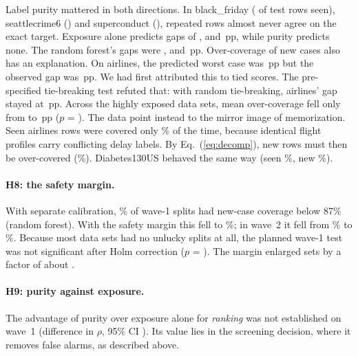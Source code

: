 Label purity mattered in both directions. In black\_friday (\NPrBfPi{} of test rows seen), seattlecrime6 (\NPrScPi{}) and superconduct (\NPrCondPi{}), repeated rows almost never agree on the exact target. Exposure alone predicts gaps of \NPrBfGp{}, \NPrScGp{} and \NPrCondGp{}\,pp, while purity predicts none. The random forest's gaps were \NPrBfRfGap{}, \NPrScRfGap{} and \NPrCondRfGap{}\,pp. Over-coverage of new cases also has an explanation. On airlines, the predicted worst case was \NPrAirGs{}\,pp but the observed gap was \NPrAirRfGap{}\,pp. We had first attributed this to tied scores. The pre-specified tie-breaking test refuted that: with random tie-breaking, airlines' gap stayed at \NTbAirRand{}\,pp. Across the \NTbN{} highly exposed data sets, mean over-coverage fell only from \NTbOverScp{} to \NTbOverRand{}\,pp ($p$ = \NTbP{}). The data point instead to the mirror image of memorization. Seen airlines rows were covered only \NMirAirSeen{}\% of the time, because identical flight profiles carry conflicting delay labels. By Eq.~(\ref{eq:decomp}), new rows must then be over-covered (\NMirAirNew{}\%). Diabetes130US behaved the same way (seen \NMirDiaSeen{}\%, new \NMirDiaNew{}\%).

\paragraph{H8: the safety margin.} With separate calibration, \NPrFourRfMcp{}\% of wave-1 splits had new-case coverage below 87\% (random forest). With the safety margin this fell to \NPrFourRfPac{}\%; in wave~2 it fell from \NWTwoFixRfBad{}\% to \NWTwoPACMCPRfBad{}\%. Because most data sets had no unlucky splits at all, the planned wave-1 test was not significant after Holm correction ($p$ = \NPrHolmPFour{}). The margin enlarged sets by a factor of about \NPrSizePac{}.

\paragraph{H9: purity against exposure.} The advantage of purity over exposure alone for \emph{ranking} was not established on wave~1 (difference in $\rho$, 95\% CI \NPrRfDiffci{}). Its value lies in the screening decision, where it removes false alarms, as described above.

